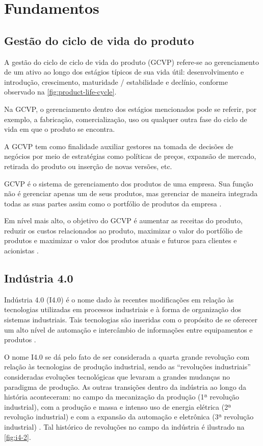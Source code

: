 \chapter{Fundamentos}

\section{Gestão do ciclo de vida do produto}

	A gestão do ciclo de ciclo de vida do produto (GCVP) refere-se ao gerenciamento de um ativo ao longo dos estágios típicos de sua vida útil: desenvolvimento e introdução, crescimento, maturidade / estabilidade e declínio, conforme observado na \autoref{fig:product-life-cycle}. 
	
	Na GCVP, o gerenciamento dentro dos estágios mencionados pode se referir, por exemplo, a fabricação, comercialização, uso ou qualquer outra fase do ciclo de vida em que o produto se encontra. 
	
	A GCVP tem como finalidade auxiliar gestores na tomada de decisões de negócios por meio de estratégias como políticas de preços, expansão de mercado, retirada do produto ou inserção de novas versões, etc.
	
	GCVP é o sistema de gerenciamento dos produtos de uma empresa. Sua função não é gerenciar apenas um de seus produtos, mas gerenciar de maneira integrada todas as suas partes assim como o portfólio de produtos da empresa \cite{stark2015lifecycle}.
	
	Em nível mais alto, o objetivo do GCVP é aumentar as receitas do produto, reduzir os custos relacionados ao produto, maximizar o valor do portfólio de produtos e maximizar o valor dos produtos atuais e futuros para clientes e acionistas \cite{stark2015lifecycle}.

\section{Indústria 4.0}

	Indústria 4.0 (I4.0) é o nome dado às recentes modificações em relação às tecnologias utilizadas em processos industriais e à forma de organização dos sistemas industriais. Tais tecnologias são inseridas com o propósito de se oferecer um alto nível de automação e intercâmbio de informações entre equipamentos e produtos \cite{lasi2014industryfour}.

	O nome I4.0 se dá pelo fato de ser considerada a quarta grande revolução com relação às tecnologias de produção industrial, sendo as ``revoluções industriais'' consideradas evoluções tecnológicas que levaram a grandes mudanças no paradigma de produção. As outras transições dentro da indústria ao longo da história aconteceram: no campo da mecanização da produção (1ª revolução industrial), com a produção e massa e intenso uso de energia elétrica (2ª revolução industrial) e com a expansão da automação e eletrônica (3ª revolução industrial) \cite{lasi2014industryfour}. Tal histórico de revoluções no campo da indústria é ilustrado na \autoref{fig:i4-2}.


